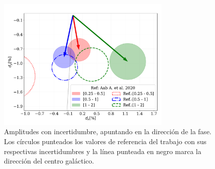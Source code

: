 \documentclass[11pt,papel,oneside,singlespace]{ibtesis}
\begin{document}
\begin{figure}[H]
    \begin{small}
        \begin{center}
            \includegraphics[width=0.75\textwidth]{comparando_sigmas_v2.pdf}
        \end{center}
        \caption{Amplitudes con incertidumbre, apuntando en la dirección  de la fase. Los círculos punteados los valores de referencia del trabajo \cite{Aab_2020} con sus respectivas incertidumbres y la línea punteada en negro marca la dirección del centro galáctico.}
        \label{fig:incertidumbre}
    \end{small}
\end{figure}

\begin{biblio}
	
\end{biblio}
    
    
\end{document}
